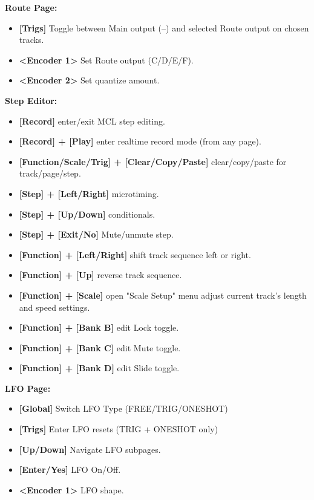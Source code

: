    \textbf{Route Page:} 
\begin{itemize}

     \item \textbf{[Trigs] }Toggle between Main output (--) and selected Route output on chosen tracks.
     \item \textbf{<Encoder 1>} Set Route output (C/D/E/F).
     \item \textbf{<Encoder 2>} Set quantize amount.
     \end{itemize}
\textbf{Step Editor:}
\begin{itemize}
      \item \textbf{[Record]} enter/exit MCL step editing.
      \item \textbf{[Record] + [Play]} enter realtime record mode (from any page).
      \item \textbf{[Function/Scale/Trig] + [Clear/Copy/Paste]} clear/copy/paste for track/page/step.
      \item \textbf{[Step] + [Left/Right]} microtiming.
      \item \textbf{[Step] + [Up/Down]} conditionals.
      \item \textbf{[Step] + [Exit/No]} Mute/unmute step.
      \item \textbf{[Function] + [Left/Right]} shift track sequence left or right.
      \item \textbf{[Function] + [Up]} reverse track sequence.
      \item \textbf{[Function] + [Scale]} open "Scale Setup" menu adjust current track's length and speed settings.
      \item \textbf{[Function] + [Bank B]} edit Lock toggle.
      \item \textbf{[Function] + [Bank C]} edit Mute toggle.
      \item \textbf{[Function] + [Bank D]} edit Slide toggle.
\end{itemize}
\textbf{LFO Page:} 
\begin{itemize}
     \item \textbf{[Global]} Switch LFO Type (FREE/TRIG/ONESHOT)
     \item \textbf{[Trigs] }Enter LFO resets (TRIG + ONESHOT only)
     \item \textbf{[Up/Down]} Navigate LFO subpages.
     \item \textbf{[Enter/Yes]} LFO On/Off.
     \item \textbf{<Encoder 1>} LFO shape.

     \end{itemize}
